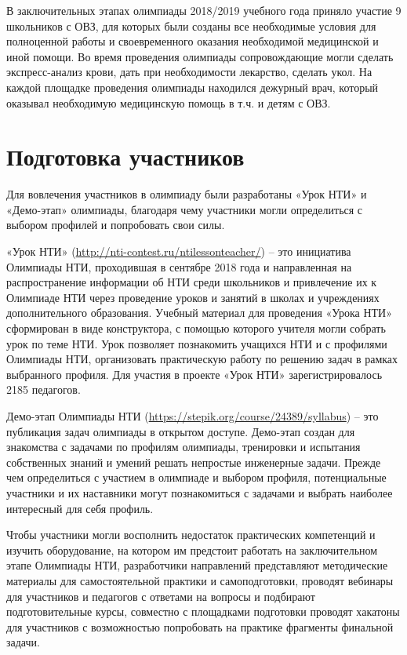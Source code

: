 В заключительных этапах олимпиады 2018/2019 учебного года приняло участие 9 школьников с ОВЗ, для которых были созданы все необходимые условия для полноценной работы и своевременного оказания необходимой медицинской и иной помощи. Во время проведения олимпиады сопровождающие могли сделать экспресс-анализ крови, дать при необходимости лекарство, сделать укол. На каждой площадке проведения олимпиады находился дежурный врач, который оказывал необходимую медицинскую помощь в т.ч. и детям с ОВЗ.

\section*{Подготовка участников}

Для вовлечения участников в олимпиаду были разработаны «Урок НТИ» и «Демо-этап» олимпиады, благодаря чему участники могли определиться с выбором профилей и попробовать свои силы.

«Урок НТИ» (\url{http://nti-contest.ru/ntilessonteacher/}) – это инициатива Олимпиады НТИ, проходившая в сентябре 2018 года и направленная на распространение информации об НТИ среди школьников и привлечение их к Олимпиаде НТИ через проведение уроков и занятий в школах и учреждениях дополнительного образования. Учебный материал для проведения «Урока НТИ» сформирован в виде конструктора, с помощью которого учителя могли собрать урок по теме НТИ. Урок позволяет познакомить учащихся НТИ и  с профилями Олимпиады НТИ, организовать практическую работу по решению задач в рамках выбранного профиля. Для участия в проекте «Урок НТИ» зарегистрировалось 2185 педагогов.

Демо-этап Олимпиады НТИ (\url{https://stepik.org/course/24389/syllabus}) – это публикация задач олимпиады в открытом доступе. Демо-этап создан для знакомства с задачами по профилям олимпиады, тренировки и испытания собственных знаний и умений решать непростые инженерные задачи.  Прежде чем определиться с участием в олимпиаде и выбором профиля,  потенциальные участники и их наставники могут познакомиться с задачами и выбрать наиболее интересный для себя профиль.

Чтобы участники могли восполнить недостаток практических компетенций и изучить оборудование, на котором им предстоит работать на заключительном этапе Олимпиады НТИ, разработчики направлений представляют методические материалы для самостоятельной практики и самоподготовки, проводят вебинары для участников и педагогов с ответами на вопросы и подбирают подготовительные курсы, совместно с площадками подготовки проводят хакатоны для участников с возможностью попробовать на практике фрагменты финальной задачи. 

